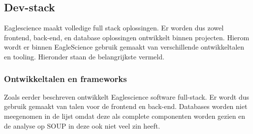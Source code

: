 \subsection{Dev-stack}\label{subsec:ESdev-stack}
Eaglescience maakt volledige full stack oplossingen. Er worden dus zowel frontend, back-end, en database oplossingen ontwikkelt binnen projecten. Hierom wordt er binnen EagleScience gebruik gemaakt van verschillende ontwikkeltalen en tooling. Hieronder staan de belangrijkste vermeld.

\subsubsection{Ontwikkeltalen en frameworks}\label{subsubsec:ontwikkeltalen-en-frameworks}
Zoals eerder beschreven ontwikkelt Eaglescience software full-stack. Er wordt dus gebruik gemaakt van talen voor de frontend en back-end. Databases worden niet meegenomen in de lijst omdat deze als complete componenten worden gezien en de analyse op SOUP in deze ook niet veel zin heeft.
